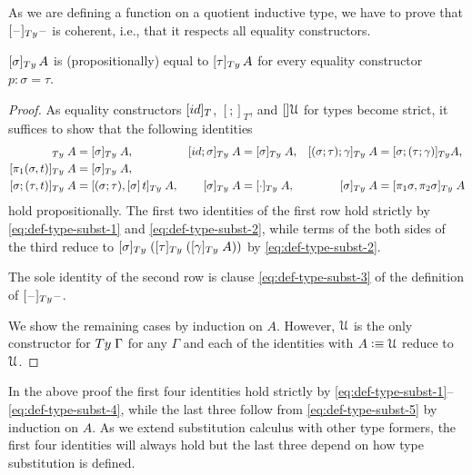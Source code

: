 \documentclass[a4paper,UKenglish,numberwithinsect,cleveref,thm-restate]{lipics-v2021}
\newcommand{\danger}{\marginpar[\hfill\dbend]{\dbend\hfill}}
\newcommand{\LT}[2][]{\todo[inline,author={L-T},caption={},color={pink},#1]{#2}}
\newcommand{\Fredrik}[2][]{\todo[inline,author={Fred},caption={},#1]{#2}}
\begin{document}
As we are defining a function on a quotient inductive type, we have to prove that $[\blank]_{\Ty}\blank$ is coherent, i.e., that it respects all equality constructors.
\begin{proposition}[Coherence]\label{prop:coherence-1}
  $[\sigma]_{\Ty}\,A$ is (propositionally) equal to $[\tau]_{\Ty}\,A$ for every equality constructor $p : \sigma = \tau$.
  \danger
\end{proposition}
\begin{proof}
  As equality constructors $[\idS]_T$, $[;]_T$, and $[]\mathcal{U}$ for types become strict, it suffices to show that the following identities
  \begin{align*}
    [\sigma;\idS]_{\Ty} \;A          & = [\sigma]_{\Ty}\;A,
                                     & [\idS;\sigma]_{\Ty} \;A          & = [\sigma]_{\Ty}\;A,
                                     & [(\sigma;\tau);\gamma]_{\Ty} \;A & = [\sigma; (\tau; \gamma)]_{\Ty}A, \\
    [\pi_1(\sigma, t)]_{\Ty}\;A      & = [\sigma]_{\Ty}\;A, \\
    [\sigma; (\tau, t)]_{\Ty} \;A    & = [(\sigma;\tau), [\sigma]\, t]_{\Ty}\;A,
                                     & [\sigma]_{\Ty} \;A               & = [\emptyctx]_{\Ty}\;A,
                                     & [\sigma]_{\Ty} \;A               & = [\pi_1\sigma, \pi_2\sigma]_{\Ty}\;A
  \end{align*}
  hold propositionally.
  The first two identities of the first row hold strictly by \eqref{eq:def-type-subst-1} and \eqref{eq:def-type-subst-2}, while terms of the both sides of the third reduce to $[\sigma]_{\Ty}\;([\tau]_{\Ty}\;([\gamma]_{\Ty}\;A))$ by \eqref{eq:def-type-subst-2}.

  The sole identity of the second row is clause \eqref{eq:def-type-subst-3} of the definition of $[\blank]_{\Ty}\blank$.

  We show the remaining cases by induction on $A$.
  However, $\mathcal{U}$ is the only constructor for $\Ty\;\Gamma$ for any $\Gamma$ and each of the identities with $A \vcentcolon\equiv \mathcal{U}$ reduce to $\mathcal{U}$.
\end{proof}
\begin{remark}\label{re:coherence-proof}
  In the above proof the first four identities hold strictly by \eqref{eq:def-type-subst-1}--\eqref{eq:def-type-subst-4}, while the last three follow from \eqref{eq:def-type-subst-5} by induction on $A$.
  As we extend substitution calculus with other type formers, the first four identities will always hold but the last three depend on how type substitution is defined.
\end{remark}
\end{document}

